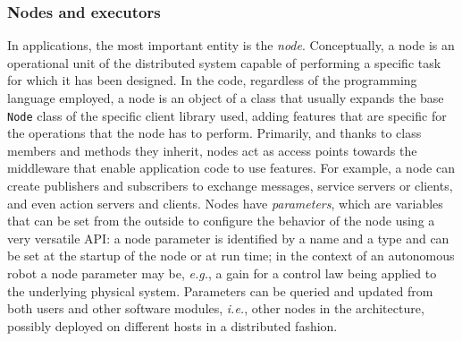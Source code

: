 \subsubsection{Nodes and executors}
\label{sec:ros2_nodes}
In \ROS applications, the most important entity is the \emph{node}. Conceptually, a \ROS node is an operational unit of the distributed system capable of performing a specific task for which it has been designed. In the code, regardless of the programming language employed, a \ROS node is an object of a class that usually expands the base \texttt{Node} class of the specific client library used, adding features that are specific for the operations that the node has to perform. Primarily, and thanks to class members and methods they inherit, nodes act as access points towards the middleware that enable application code to use \ROS features. For example, a node can create publishers and subscribers to exchange messages, service servers or clients, and even action servers and clients. Nodes have \emph{parameters}, which are variables that can be set from the outside to configure the behavior of the node using a very versatile API: a node parameter is identified by a name and a type and can be set at the startup of the node or at run time; in the context of an autonomous robot a \ROS node parameter may be, \emph{e.g.}, a gain for a control law being applied to the underlying physical system. Parameters can be queried and updated from both users and other software modules, \emph{i.e.}, other nodes in the architecture, possibly deployed on different hosts in a distributed fashion.

